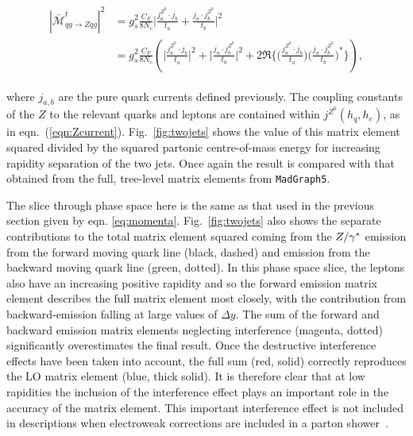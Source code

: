 		\begin{align}
		\begin{split}
			{|\bar{\mathcal{M}}_{qg\to Zqg}^{t}|}^2 &= g_s^2 \frac{C_F}{8N_c}
			\Big|\frac{j^{Z^0}_a\cdot j_b}{t_a} + \frac{j_a\cdot
			j^{Z^0}_b}{t_b}\Big|^2\\
			&= g_s^2 \frac{C_F}{8N_c} \left( \Big|\frac{j^{Z^0}_a\cdot j_b}{t_a}\Big|^2 + \Big|\frac{j_a\cdot
			j^{Z^0}_b}{t_b}\Big|^2 + 2\Re{\Big\{\Big(\frac{j^{Z^0}_a\cdot
			j_b}{t_a}\Big)\Big(\frac{j_a\cdot j^{Z^0}_b}{t_b}\Big)^*\Big\}} \right),
			\label{eqn:interference}
		\end{split}
		\end{align}

		where $j_{a,b}$ are the pure quark currents defined previously.  The
		coupling constants of the $Z$ to the relevant quarks and leptons are contained
		within $j^{Z^0}(h_q,h_e)$, as in eqn.~(\eqref{eqn:Zcurrent}).  Fig.~\eqref{fig:twojets}
		shows the value of this matrix element squared divided by the squared partonic
		centre-of-mass energy for increasing rapidity separation of the two jets. Once again the
		result is compared with that obtained from the full, tree-level matrix elements from
		\texttt{MadGraph5}.

		The slice through phase space here is the same as that used in the previous
		section given by eqn. \eqref{eq:momenta}.  Fig.~\eqref{fig:twojets} also shows
		the separate contributions to the total matrix element squared coming from the
		$Z/\gamma^*$ emission from the forward moving quark line (black, dashed) and emission
		from the backward moving quark line (green, dotted).  In this phase space slice,
		the leptons also have an increasing positive rapidity and so the forward emission
		matrix element describes the full matrix element most closely, with the contribution
		from backward-emission falling at large values of $\Delta y$.  The sum of the forward
		and backward emission matrix elements neglecting interference (magenta, dotted)
		significantly overestimates the final result.  Once the destructive interference
		effects have been taken into account, the full sum (red, solid) correctly reproduces
		the LO matrix element (blue, thick solid).  It is therefore clear that at low
		rapidities the inclusion of the interference effect plays an important role in
		the accuracy of the matrix element.  This important interference effect is not
		included in descriptions when electroweak corrections are included in a parton
		shower~\cite{Christiansen:2014kba,Krauss:2014yaa,Christiansen:2015jpa}.

